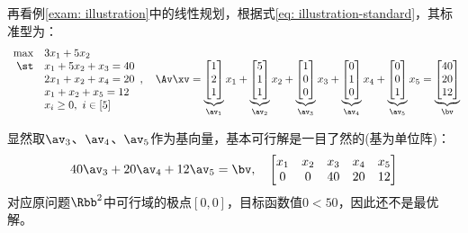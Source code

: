 \documentclass{ctexart}
\begin{document}
\begin{example} \label{exam: simplex}
    再看例\ref{exam: illustration}中的线性规划，根据式\eqref{eq: illustration-standard}，其标准型为：
    \begin{align*}
        \begin{array}{rl}
            \max & 3 x_1 + 5 x_2          \\
            \st  & x_1 + 5 x_2 + x_3 = 40 \\
                 & 2 x_1 + x_2 + x_4 = 20 \\
                 & x_1 + x_2 + x_5 = 12   \\
                 & x_i \ge 0, ~ i \in [5]
        \end{array}, \quad \Av \xv =
        \underbrace{\begin{bmatrix}
                            1 \\ 2 \\ 1
                        \end{bmatrix}}_{\av_1} x_1 +
        \underbrace{\begin{bmatrix}
                            5 \\ 1 \\ 1
                        \end{bmatrix}}_{\av_2} x_2 +
        \underbrace{\begin{bmatrix}
                            1 \\ 0 \\ 0
                        \end{bmatrix}}_{\av_3} x_3 +
        \underbrace{\begin{bmatrix}
                            0 \\ 1 \\ 0
                        \end{bmatrix}}_{\av_4} x_4 +
        \underbrace{\begin{bmatrix}
                            0 \\ 0 \\ 1
                        \end{bmatrix}}_{\av_5} x_5 =
        \underbrace{\begin{bmatrix}
                            40 \\ 20 \\ 12
                        \end{bmatrix}}_{\bv}
    \end{align*}

    显然取$\av_3$、$\av_4$、$\av_5$作为基向量，基本可行解是一目了然的(基为单位阵)：
    \begin{align*}
        40 \av_3 + 20 \av_4 + 12 \av_5 = \bv, \quad
        \begin{bmatrix}
            x_1 & x_2 & x_3 & x_4 & x_5 \\
            0   & 0   & 40  & 20  & 12
        \end{bmatrix}
    \end{align*}
    对应原问题$\Rbb^2$中可行域的极点$[0,0]$，目标函数值$0 < 50$，因此还不是最优解。


\end{example}
\end{document}
